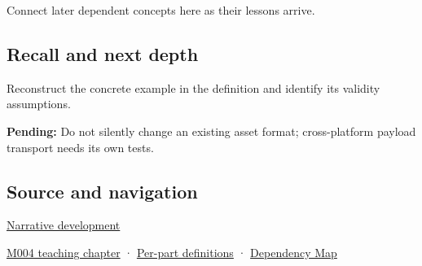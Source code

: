 Connect later dependent concepts here as their lessons arrive.

\subsection{Recall and next depth}\label{appendix-e90053a4b201-recall-and-next-depth}

Reconstruct the concrete example in the definition and identify its validity assumptions.

\textbf{Pending:} Do not silently change an existing asset format; cross-platform payload transport needs its own tests.

\subsection{Source and navigation}\label{appendix-e90053a4b201-source-and-navigation}

\hyperref[01-foundations-i-ch001-choosing-what-information-to-keep]{Narrative development}

\hyperref[01-foundations-i-ch001-a-stretching-ruler-for-real-valued-quantities]{M004 teaching chapter} · \hyperref[appendix-fd090d982a15-m004---parts-61-76]{Per-part definitions} · \hyperref[appendix-4ad47bdd269a]{Dependency Map}
